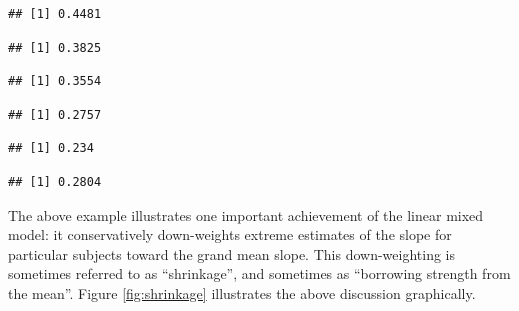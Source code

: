 \documentclass[
  12pt,
]{krantz}
\newenvironment{Shaded}{\begin{snugshade}}{\end{snugshade}}
\newcommand{\DecValTok}[1]{\textcolor[rgb]{0.00,0.00,0.81}{#1}}
\newcommand{\DocumentationTok}[1]{\textcolor[rgb]{0.56,0.35,0.01}{\textbf{\textit{#1}}}}
\newcommand{\FunctionTok}[1]{\textcolor[rgb]{0.00,0.00,0.00}{#1}}
\newcommand{\NormalTok}[1]{#1}
\newcommand{\OtherTok}[1]{\textcolor[rgb]{0.56,0.35,0.01}{#1}}
\newcommand{\SpecialCharTok}[1]{\textcolor[rgb]{0.00,0.00,0.00}{#1}}
\theoremstyle{definition}
\theoremstyle{definition}
\theoremstyle{definition}
\theoremstyle{definition}
\theoremstyle{remark}
\begin{document}
\begin{Shaded}
\end{Shaded}

\begin{verbatim}
## [1] 0.4481
\end{verbatim}

\begin{verbatim}
## [1] 0.3825
\end{verbatim}

\begin{verbatim}
## [1] 0.3554
\end{verbatim}

\begin{Shaded}
\end{Shaded}

\begin{verbatim}
## [1] 0.2757
\end{verbatim}

\begin{verbatim}
## [1] 0.234
\end{verbatim}

\begin{verbatim}
## [1] 0.2804
\end{verbatim}

The above example illustrates one important achievement of the linear mixed model: it conservatively down-weights extreme estimates of the slope for particular subjects toward the grand mean slope. This down-weighting is sometimes referred to as ``shrinkage'', and sometimes as ``borrowing strength from the mean''. Figure \ref{fig:shrinkage} illustrates the above discussion graphically.
\end{document}

